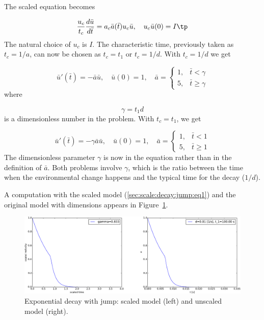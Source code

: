\documentclass[graybox,envcountchap,sectrefs,final]{svmonodo}
\begin{document}

The scaled equation becomes

\[ \frac{u_c}{t_c}\frac{d\bar u}{d\bar t} = a_c\bar a(\bar t) u_c\bar u,\quad
u_c\bar u(0) = I\tp\]
The natural choice of $u_c$ is $I$.
The characteristic time, previously taken as $t_c=1/a$, can now be
chosen as $t_c=t_1$ or $t_c=1/d$.
With $t_c=1/d$ we get

\begin{equation}
\bar u'(\bar t)=-\bar a\bar u,\quad \bar u(0)=1,\quad
\bar a = \left\lbrace\begin{array}{ll}
1, & \bar t < \gamma\\ 
5, & \bar t \geq \gamma
\end{array}\right.
\label{sec:scale:decay:jump:eq1}
\end{equation}
where

\[ \gamma = t_1 d\]
is a dimensionless number in the problem. With $t_c=t_1$, we get

\[ \bar u'(\bar t)=-\gamma\bar a\bar u,\quad \bar u(0)=1,\quad
\bar a = \left\lbrace\begin{array}{ll}
1, & \bar t < 1\\ 
5, & \bar t \geq 1
\end{array}\right.\]
The dimensionless parameter $\gamma$ is now in the equation rather than in
the definition of $\bar a$. Both problems involve $\gamma$, which
is the ratio between the time when the environmental change happens
and the typical time for the decay ($1/d$).

A computation with the scaled model (\ref{sec:scale:decay:jump:eq1})
and the original model with dimensions appears in
Figure~\ref{sec:scale:decay:jump:fig}.


\begin{figure}[!ht]  %
  \centerline{\includegraphics[width=1.0\linewidth]{fig-scaling/decay_jump.pdf}}
  \caption{
  Exponential decay with jump: scaled model (left) and unscaled model (right). \label{sec:scale:decay:jump:fig}
  }
\end{figure}
\end{document}
